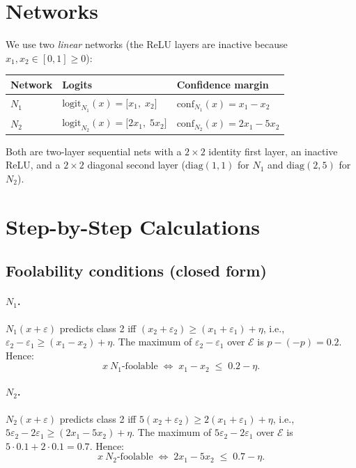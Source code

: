 \documentclass[12pt]{article}
\theoremstyle{definition}
\theoremstyle{plain}
\theoremstyle{remark}
\newcommand{\conf}[2]{\mathrm{conf}_{#1}(#2)}
\newcommand{\Edom}{\mathcal{E}}
\begin{document}
\section{Networks}

We use two \emph{linear} networks (the ReLU layers are inactive because
$x_1,x_2\in[0,1]\geq 0$):

\medskip
\begin{center}
\begin{tabular}{lll}
\toprule
Network & Logits & Confidence margin \\
\midrule
$N_1$ & $\mathrm{logit}_{N_1}(x)=\bigl[x_1,\;x_2\bigr]$
      & $\conf{N_1}{x} = x_1 - x_2$ \\[4pt]
$N_2$ & $\mathrm{logit}_{N_2}(x)=\bigl[2x_1,\;5x_2\bigr]$
      & $\conf{N_2}{x} = 2x_1 - 5x_2$ \\
\bottomrule
\end{tabular}
\end{center}

\medskip\noindent
Both are two-layer sequential nets with a $2\times2$ identity first layer,
an inactive ReLU, and a $2\times2$ diagonal second layer
($\mathrm{diag}(1,1)$ for $N_1$ and $\mathrm{diag}(2,5)$ for $N_2$).

\section{Step-by-Step Calculations}

\subsection{Foolability conditions (closed form)}

\paragraph{$N_1$.}
$N_1(x+\varepsilon)$ predicts class 2 iff
$(x_2+\varepsilon_2)\geq(x_1+\varepsilon_1)+\eta$,
i.e., $\varepsilon_2-\varepsilon_1\geq(x_1-x_2)+\eta$.
The maximum of $\varepsilon_2-\varepsilon_1$ over $\Edom$ is
$p-(-p)=0.2$.
Hence:
\[
  \boxed{x\ N_1\text{-foolable}
  \;\Longleftrightarrow\;
  x_1-x_2 \;\leq\; 0.2-\eta.}
\]

\paragraph{$N_2$.}
$N_2(x+\varepsilon)$ predicts class 2 iff
$5(x_2+\varepsilon_2)\geq 2(x_1+\varepsilon_1)+\eta$,
i.e., $5\varepsilon_2-2\varepsilon_1\geq(2x_1-5x_2)+\eta$.
The maximum of $5\varepsilon_2-2\varepsilon_1$ over $\Edom$ is
$5\cdot 0.1+2\cdot 0.1=0.7$.
Hence:
\[
  \boxed{x\ N_2\text{-foolable}
  \;\Longleftrightarrow\;
  2x_1-5x_2 \;\leq\; 0.7-\eta.}
\]
\end{document}
